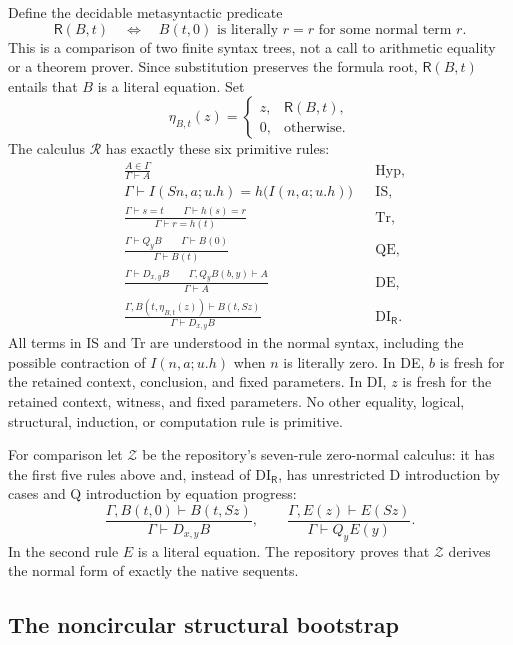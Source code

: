 Define the decidable metasyntactic predicate
\[
 \mathsf R(B,t)\quad\Longleftrightarrow\quad
 B(t,0)\text{ is literally }r=r\text{ for some normal term }r.
\]
This is a comparison of two finite syntax trees, not a call to arithmetic
equality or a theorem prover.  Since substitution preserves the formula
root, $\mathsf R(B,t)$ entails that $B$ is a literal equation.
Set
\[
 \eta_{B,t}(z)=
 \begin{cases}z,&\mathsf R(B,t),\\0,&\text{otherwise}.\end{cases}
\]
The calculus $\mathcal R$ has exactly these six primitive rules:
\begin{align*}
 &\frac{A\in\Gamma}{\Gamma\vdash A} &&\mathrm{Hyp},\\[3pt]
 &\Gamma\vdash
 I(Sn,a;u.h)=h\bigl(I(n,a;u.h)\bigr) &&\mathrm{IS},\\[3pt]
 &\frac{\Gamma\vdash s=t\qquad\Gamma\vdash h(s)=r}
        {\Gamma\vdash r=h(t)} &&\mathrm{Tr},\\[5pt]
 &\frac{\Gamma\vdash Q_yB\qquad\Gamma\vdash B(0)}
        {\Gamma\vdash B(t)} &&\mathrm{QE},\\[5pt]
 &\frac{\Gamma\vdash D_{x,y}B\qquad
         \Gamma,Q_yB(b,y)\vdash A}{\Gamma\vdash A} &&\mathrm{DE},\\[5pt]
 &\frac{\Gamma,B(t,\eta_{B,t}(z))\vdash B(t,Sz)}
        {\Gamma\vdash D_{x,y}B} &&\mathrm{DI}_{\mathsf R}.
\end{align*}
All terms in IS and Tr are understood in the normal syntax, including
the possible contraction of $I(n,a;u.h)$ when $n$ is literally zero.
In DE, $b$ is fresh for the retained context, conclusion, and fixed
parameters.  In DI, $z$ is fresh for the retained context, witness, and
fixed parameters.  No other equality, logical, structural, induction,
or computation rule is primitive.

For comparison let $\mathcal Z$ be the repository's seven-rule
zero-normal calculus: it has the first five rules above and, instead of
$\mathrm{DI}_{\mathsf R}$, has unrestricted D introduction by cases and
Q introduction by equation progress:
\[
 \frac{\Gamma,B(t,0)\vdash B(t,Sz)}{\Gamma\vdash D_{x,y}B},
 \qquad
 \frac{\Gamma,E(z)\vdash E(Sz)}{\Gamma\vdash Q_yE(y)}.
\]
In the second rule $E$ is a literal equation.  The repository proves
that $\mathcal Z$ derives the normal form of exactly the native sequents.

\subsection{The noncircular structural bootstrap}

